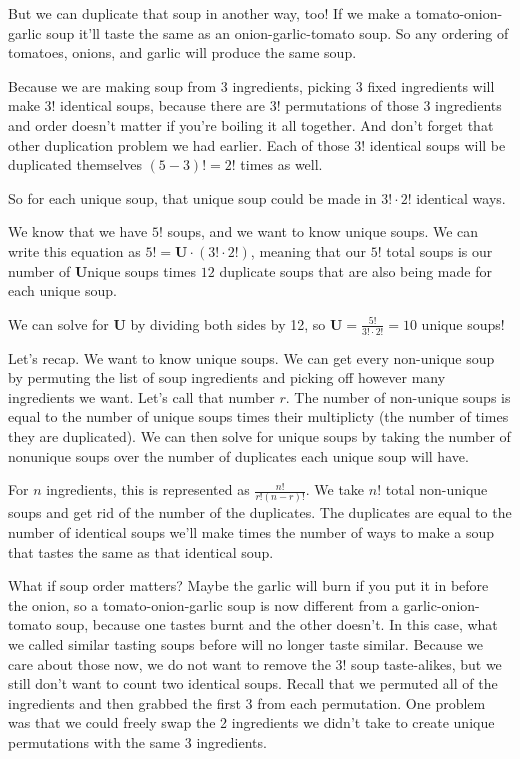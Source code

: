 \documentclass{article}
\begin{document}
    But we can duplicate that soup in another way, too!
    If we make a tomato-onion-garlic soup it'll taste the same as an onion-garlic-tomato soup.
    So any ordering of tomatoes, onions, and garlic will produce the same soup.

    Because we are making soup from 3 ingredients, picking 3 fixed ingredients will make $3!$ identical soups, because there are $3!$ permutations of those 3 ingredients
    and order doesn't matter if you're boiling it all together.
    And don't forget that other duplication problem we had earlier.
    Each of those $3!$ identical soups will be duplicated themselves $(5-3)! = 2!$ times as well.

    So for each unique soup, that unique soup could be made in $3! \cdot 2!$ identical ways.

    We know that we have $5!$ soups, and we want to know unique soups.
    We can write this equation as $5! = \textbf{U} \cdot (3! \cdot 2!)$,
    meaning that our $5!$ total soups is our number of \textbf{U}nique soups times $12$ duplicate soups that are also being made for each unique soup.

    We can solve for \textbf{U} by dividing both sides by 12, so $\textbf{U} = \frac{5!}{3! \cdot 2!} = 10$ unique soups!

    Let's recap.
    We want to know unique soups.
    We can get every non-unique soup by permuting the list of soup ingredients and picking off however many ingredients we want.
    Let's call that number $r$.
    The number of non-unique soups is equal to the number of unique soups times their multiplicty (the number of times they are duplicated).
    We can then solve for unique soups by taking the number of nonunique soups over the number of duplicates each unique soup will have.

    For $n$ ingredients, this is represented as $\frac{n!}{r! (n - r)!}$.
    We take $n!$ total non-unique soups and get rid of the number of the duplicates.
    The duplicates are equal to the number of identical soups we'll make times the number of ways to make a soup that tastes the same as that identical soup.

    What if soup order matters?
    Maybe the garlic will burn if you put it in before the onion, so a tomato-onion-garlic soup is now different from a garlic-onion-tomato soup, because one tastes burnt and the other doesn't.
    In this case, what we called similar tasting soups before will no longer taste similar.
    Because we care about those now, we do not want to remove the $3!$ soup taste-alikes, but
    we still don't want to count two identical soups.
    Recall that we permuted all of the ingredients and then grabbed the first 3 from each permutation.
    One problem was that we could freely swap the 2 ingredients we didn't take
    to create unique permutations with the same 3 ingredients.
    
\end{document}
